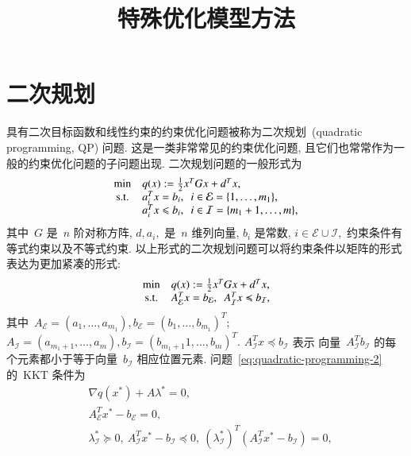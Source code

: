 \documentclass{SBCbookchapter}
\author{}
\title{特殊优化模型方法}
\numberwithin{equation}{section}
\begin{document}
\maketitle


\section{二次规划}
\label{sec:7.2}


具有二次目标函数和线性约束的约束优化问题被称为二次规划~(quadratic programming, QP) 问题. 这是一类非常常见的约束优化问题, 且它们也常常作为一般的约束优化问题的子问题出现. 二次规划问题的一般形式为
\begin{equation}
\label{eq:quadratic-programming-1}
\begin{array}{cl}
\min & q({x}) := \frac{1}{2} {x}^T G {x} + {d}^T {x}, \\
{\rm s.t.} & {a}_i^T {x} = b_i, ~~ i \in \mathcal{E} = \{1, \ldots, m_1\}, \\
& {a}_i^T {x} \leqslant b_i, ~~ i \in \mathcal{I} = \{m_1 + 1, \ldots, m\},
\end{array}
\end{equation}
其中~$G$ 是~$n$ 阶对称方阵, ${d}, {a}_i,$ 是~$n$ 维列向量, $b_i$ 是常数, $i \in \mathcal{E} \cup \mathcal{I},$ 约束条件有等式约束以及不等式约束. 以上形式的二次规划问题可以将约束条件以矩阵的形式表达为更加紧凑的形式:
\begin{equation}
\label{eq:quadratic-programming-2}
\begin{array}{cl}
\min & q({x}) := \frac{1}{2} {x}^T G {x} + {d}^T {x}, \\
{\rm s.t.} & A^T_{\mathcal{E}} {x} = {b}_{\mathcal{E}}, ~~ A^T_{\mathcal{I}} x \preccurlyeq {b}_{\mathcal{I}},
\end{array}
\end{equation}
其中~$A_{\mathcal{E}} = ({a}_1, \ldots, {a}_{m_1}), {b}_{\mathcal{E}} = (b_1, \ldots, b_{m_1})^T;$ $A_{\mathcal{I}} = ({a}_{m_1+1}, \ldots, {a}_m), {b}_{\mathcal{I}} = (b_{m_1+1}1, \ldots, b_m)^T.$ $A^T_{\mathcal{I}} {x} \preccurlyeq {b}_{\mathcal{I}}$ 表示
向量~$A^T_{\mathcal{I}} {b}_{\mathcal{I}}$ 的每个元素都小于等于向量~${b}_{\mathcal{I}}$ 相应位置元素. 问题~\eqref{eq:quadratic-programming-2} 的~KKT 条件为
\begin{equation}
\label{eq:quadratic-programming-kkt}
\begin{aligned}
& \nabla q({x}^*) + A {\lambda}^* = {0}, \\
& A^T_{\mathcal{E}} {x}^* - {b}_{\mathcal{E}} = {0}, \\
& {\lambda}^*_{\mathcal{I}} \succcurlyeq {0}, ~ A_{\mathcal{I}}^T {x}^* - {b}_{\mathcal{I}} \preccurlyeq {0}, ~ ({\lambda}^*_{\mathcal{I}})^T (A_{\mathcal{I}}^T {x}^* - {b}_{\mathcal{I}}) = {0},
\end{aligned}
\end{equation}
\end{document}
